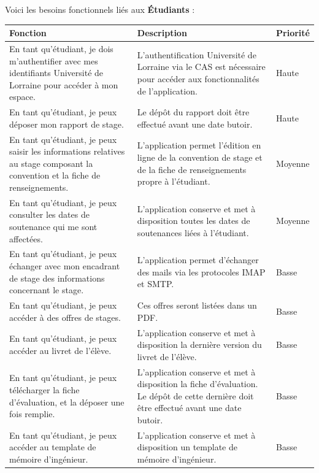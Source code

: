 \documentclass{scrreprt}
\begin{document}
Voici les besoins fonctionnels liés aux \textbf{Étudiants} :
\begin{center}
\vspace {0.2cm}
\begin{tabular}{|p{5cm}|p{7cm}|p{2cm}|}
  \hline
  \textbf {Fonction} & \textbf {Description} & \textbf {Priorité} \\
  \hline
  En tant qu'étudiant, je dois m'authentifier avec mes identifiants Université de Lorraine pour accéder à mon espace. & L'authentification Université de Lorraine via le CAS est nécessaire pour accéder aux fonctionnalités de l'application. & Haute\\
  \hline
  En tant qu'étudiant, je peux déposer mon rapport de stage. & Le dépôt du rapport doit être effectué avant une date butoir. & Haute\\ 
  \hline
  En tant qu'étudiant, je peux saisir les informations relatives au stage composant la convention et la fiche de renseignements. & L'application permet l’édition en ligne de la convention de stage et de la fiche de renseignements propre à l'étudiant. & Moyenne\\
  \hline
  En tant qu'étudiant, je peux consulter les dates de soutenance qui me sont affectées. & L'application conserve et met à disposition toutes les dates de soutenances liées à l'étudiant. & Moyenne\\
  \hline
  En tant qu'étudiant, je peux échanger avec mon encadrant de stage des informations concernant le stage. & L'application permet d'échanger des mails via les protocoles IMAP et SMTP. & Basse\\
  \hline
  En tant qu'étudiant, je peux accéder à des offres de stages. & Ces offres seront listées dans un PDF. & Basse\\
  \hline
  En tant qu'étudiant, je peux accéder au livret de l'élève. & L'application conserve et met à disposition la dernière version du livret de l'élève. & Basse\\
  \hline
  En tant qu'étudiant, je peux télécharger la fiche d'évaluation, et la déposer une fois remplie. & L'application conserve et met à disposition la fiche d'évaluation. Le dépôt de cette dernière doit être effectué avant une date butoir. & Basse\\
  \hline  
  En tant qu'étudiant, je peux accéder au template de mémoire d'ingénieur. & L'application conserve et met à disposition un template de mémoire d'ingénieur. & Basse\\
  \hline
\end{tabular}
\end{center}
\end{document}
